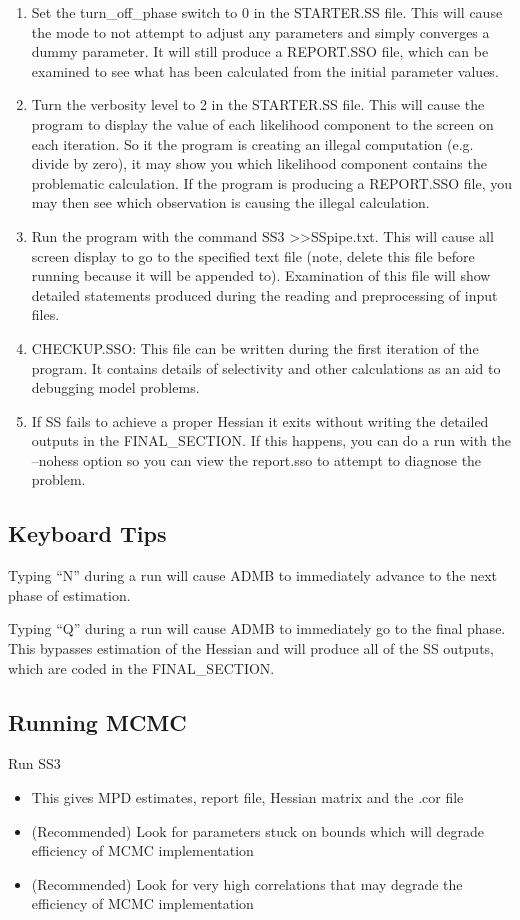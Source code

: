 \begin{enumerate}
	\item Set the turn\_off\_phase switch to 0 in the STARTER.SS file.  This will cause the mode to not attempt to adjust any parameters and simply converges a dummy parameter.  It will still produce a REPORT.SSO file, which can be examined to see what has been calculated from the initial parameter values.
	\item Turn the verbosity level to 2 in the STARTER.SS file.  This will cause the program to display the value of each likelihood component to the screen on each iteration.  So it the program is creating an illegal computation (e.g. divide by zero), it may show you which likelihood component contains the problematic calculation.  If the program is producing a REPORT.SSO file, you may then see which observation is causing the illegal calculation.
	\item Run the program with the command SS3 >>SSpipe.txt.  This will cause all screen display to go to the specified text file (note, delete this file before running because it will be appended to).  Examination of this file will show detailed statements produced during the reading and preprocessing of input files.
	\item CHECKUP.SSO:  This file can be written during the first iteration of the program.  It contains details of selectivity and other calculations as an aid to debugging model problems. 
	\item If SS fails to achieve a proper Hessian it exits without writing the detailed outputs in the FINAL\_SECTION.  If this happens, you can do a run with the –nohess option so you can view the report.sso to attempt to diagnose the problem.
\end{enumerate}

\subsection{Keyboard Tips}
Typing “N” during a run will cause ADMB to immediately advance to the next phase of estimation.

Typing “Q”  during a run will cause ADMB to immediately go to the final phase.  This bypasses estimation of the Hessian and will produce all of the SS outputs, which are coded in the FINAL\_SECTION.

\subsection{Running MCMC}
 Run SS3
 \begin{itemize}
 	\item This gives MPD estimates, report file, Hessian matrix and the .cor file
 	\item (Recommended) Look for parameters stuck on bounds which will degrade efficiency of MCMC implementation
 	\item (Recommended) Look for very high correlations that may degrade the efficiency of MCMC implementation
 \end{itemize}
 

